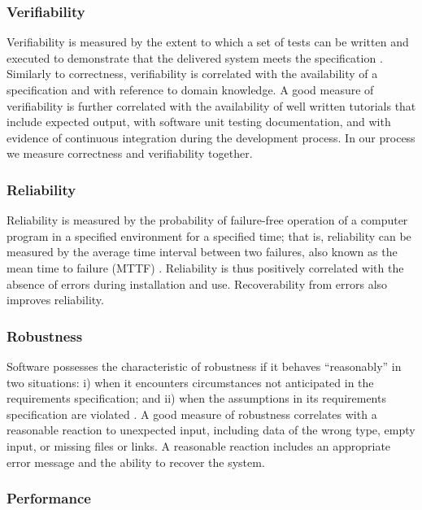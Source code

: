 \documentclass[final, 3p, times, authoryear]{elsarticle}
\begin{document}
\subsubsection{Verifiability}

Verifiability is measured by the extent to which a set of tests can be written
and executed to demonstrate that the delivered system meets the specification
\citep{sommerville}. Similarly to correctness, verifiability is correlated with
the availability of a specification and with reference to domain knowledge. A
good measure of verifiability is further correlated with the availability of
well written tutorials that include expected output, with software unit testing
documentation, and with evidence of continuous integration during the
development process. In our process we measure correctness and verifiability
together.

\subsubsection{Reliability}

Reliability is measured by the probability of failure-free operation of a
computer program in a specified environment for a specified time; that is,
reliability can be measured by the average time interval between two failures,
also known as the mean time to failure (MTTF) \citep{GhezziEtAl2003}
\citep{musa1987software}. Reliability is thus positively correlated with the
absence of errors during installation and use. Recoverability from errors also
improves reliability.

\subsubsection{Robustness}

Software possesses the characteristic of robustness if it behaves ``reasonably''
in two situations: i) when it encounters circumstances not anticipated in the
requirements specification; and ii) when the assumptions in its requirements
specification are violated \citep{boehm2007software, ghezzi1991fundamentals}. A
good measure of robustness correlates with a reasonable reaction to unexpected
input, including data of the wrong type, empty input, or missing files or links.
A reasonable reaction includes an appropriate error message and the ability to
recover the system.

\subsubsection{Performance}
\end{document}

